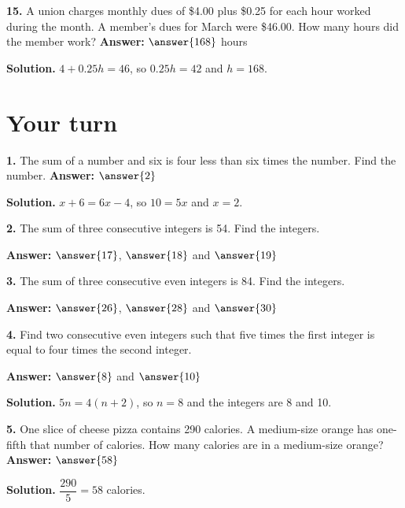 \documentclass{ximera}
\begin{document}
\begin{problem}
\textbf{15.} A union charges monthly dues of \$4.00 plus \$0.25 for each hour worked
during the month. A member's dues for March were \$46.00. How many hours did the member
work? \qquad \textbf{Answer:} $\answer{168}$ hours

\begin{hint}
\textbf{Solution.} $4+0.25h=46$, so $0.25h=42$ and $h=168$.
\end{hint}
\end{problem}

\section*{Your turn}

\begin{problem}
\textbf{1.} The sum of a number and six is four less than six times the number. Find the
number. \qquad \textbf{Answer:} $\answer{2}$

\begin{hint}
\textbf{Solution.} $x+6=6x-4$, so $10=5x$ and $x=2$.
\end{hint}
\end{problem}

\begin{problem}
\textbf{2.} The sum of three consecutive integers is 54. Find the integers.

\textbf{Answer:} $\answer{17}$, $\answer{18}$ and $\answer{19}$
\end{problem}

\begin{problem}
\textbf{3.} The sum of three consecutive even integers is 84. Find the integers.

\textbf{Answer:} $\answer{26}$, $\answer{28}$ and $\answer{30}$
\end{problem}

\begin{problem}
\textbf{4.} Find two consecutive even integers such that five times the first integer is
equal to four times the second integer.

\textbf{Answer:} $\answer{8}$ and $\answer{10}$

\begin{hint}
\textbf{Solution.} $5n=4(n+2)$, so $n=8$ and the integers are 8 and 10.
\end{hint}
\end{problem}

\begin{problem}
\textbf{5.} One slice of cheese pizza contains 290 calories. A medium-size orange has
one-fifth that number of calories. How many calories are in a medium-size orange?
\qquad \textbf{Answer:} $\answer{58}$

\begin{hint}
\textbf{Solution.} $\dfrac{290}{5}=58$ calories.
\end{hint}
\end{problem}
\end{document}

